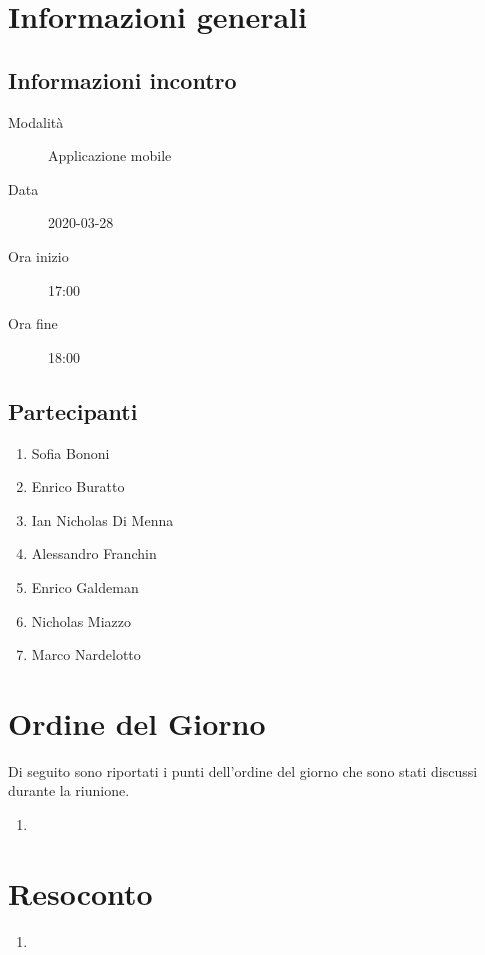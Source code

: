 \documentclass{article}
\begin{document}


\section{Informazioni generali}%
\label{sec:informazioni_generali}

\subsection{Informazioni incontro}%
\label{sub:informazioni_incontro}

\begin{description}
  \item[Modalità] Applicazione mobile 
  \item[Data] 2020-03-28
  \item[Ora inizio] 17:00
  \item[Ora fine] 18:00
\end{description}

\subsection{Partecipanti}%
\label{sub:partecipanti}

\begin{enumerate}
  \item Sofia Bononi
  \item Enrico Buratto
  \item Ian Nicholas Di Menna
  \item Alessandro Franchin
  \item Enrico Galdeman
  \item Nicholas Miazzo
  \item Marco Nardelotto
\end{enumerate}

\section{Ordine del Giorno}%
\label{ordine_del_giorno}
Di seguito sono riportati i punti dell'ordine del giorno che sono stati discussi durante la riunione.
\begin{enumerate}
  \item 
\end{enumerate}

\section{Resoconto}%
\label{resoconto}
\begin{enumerate}
  \item \textbf{}
\end{enumerate}
\end{document}

